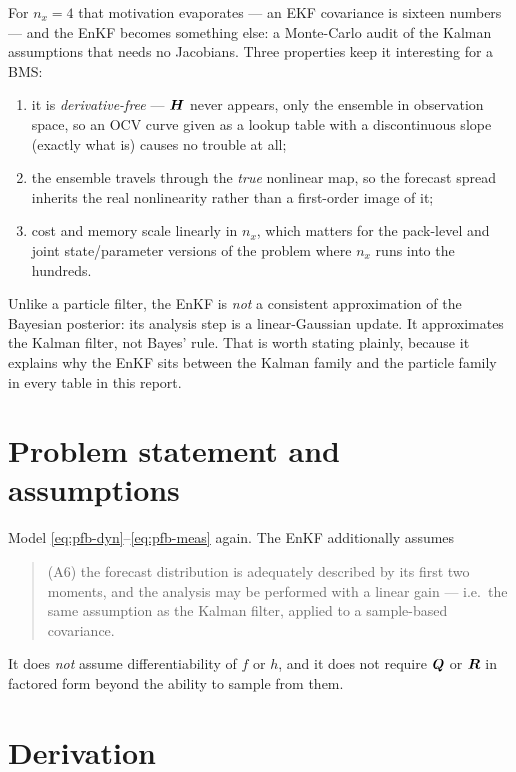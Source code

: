 For $n_x = 4$ that motivation evaporates --- an EKF covariance is sixteen numbers --- and the EnKF
becomes something else: a Monte-Carlo audit of the Kalman assumptions that needs no Jacobians.
Three properties keep it interesting for a BMS:
\begin{enumerate}[label=(\roman*),leftmargin=2.5em]
  \item it is \emph{derivative-free} --- $\bm{H}$ never appears, only the ensemble in observation
        space, so an OCV curve given as a lookup table with a discontinuous slope (exactly what
         is) causes no trouble at all;
  \item the ensemble travels through the \emph{true} nonlinear map, so the forecast spread
        inherits the real nonlinearity rather than a first-order image of it;
  \item cost and memory scale linearly in $n_x$, which matters for the pack-level and
        joint state/parameter versions of the problem where $n_x$ runs into the hundreds.
\end{enumerate}
Unlike a particle filter, the EnKF is \emph{not} a consistent approximation of the Bayesian
posterior: its analysis step is a linear-Gaussian update.  It approximates the Kalman filter, not
Bayes' rule.  That is worth stating plainly, because it explains why the EnKF sits between the
Kalman family and the particle family in every table in this report.

\section{Problem statement and assumptions}
Model \eqref{eq:pfb-dyn}--\eqref{eq:pfb-meas} again.  The EnKF additionally assumes
\begin{quote}
(A6) the forecast distribution is adequately described by its first two moments, and the analysis
may be performed with a linear gain --- i.e.\ the same assumption as the Kalman filter, applied to
a sample-based covariance.
\end{quote}
It does \emph{not} assume differentiability of $f$ or $h$, and it does not require $\bm{Q}$ or $\bm{R}$
in factored form beyond the ability to sample from them.

\section{Derivation}

